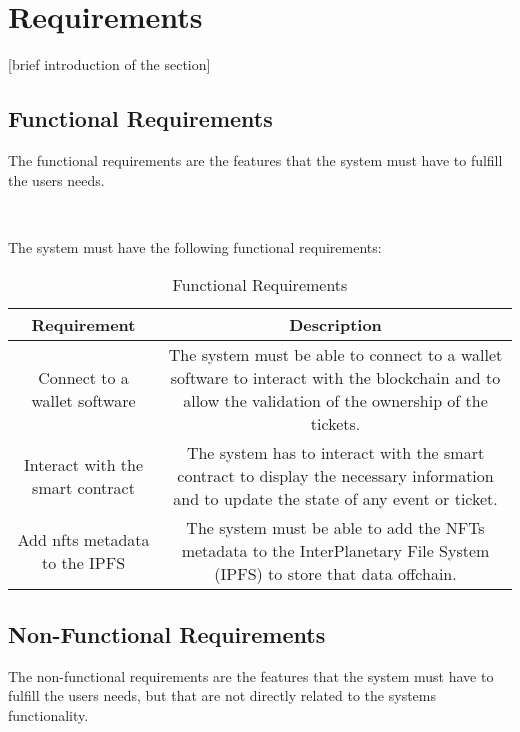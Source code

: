 \section{Requirements}
\label{sec:requirements}

[brief introduction of the section]

\subsection{Functional Requirements}
\label{subsec:functional_requirements}

The functional requirements are the features that the system must have to fulfill the users needs.

~

The system must have the following functional requirements:

\begin{table}[H]
    \caption{Functional Requirements}
    \label{tab:functional_requirements}
    \begin{tabular}{|c|c|}
        \hline
        \textbf{Requirement}             & \textbf{Description}                                                                                                                                 \\
        \hline
        Connect to a wallet software     & The system must be able to connect to a wallet software to interact with the blockchain and to allow the validation of the ownership of the tickets. \\
        \hline
        Interact with the smart contract & The system has to interact with the smart contract to display the necessary information and to update the state of any event or ticket.              \\
        \hline
        Add nfts metadata to the IPFS    & The system must be able to add the NFTs metadata to the InterPlanetary File System (IPFS) to store that data offchain.                               \\
        \hline
    \end{tabular}
\end{table}


\subsection{Non-Functional Requirements}
\label{subsec:non_functional_requirements}

The non-functional requirements are the features that the system must have to fulfill the users needs, but that are not directly related to the systems functionality.

